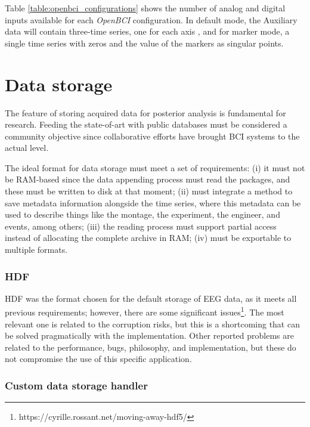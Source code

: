 

Table \ref{table:openbci_configurations} shows the number of analog and digital inputs available for each \textit{OpenBCI} configuration. In default mode, the Auxiliary data will contain three-time series, one for each axis , and for marker mode, a single time series with zeros and the value of the markers as singular points. 

\section{Data storage}

The feature of storing acquired data for posterior analysis is fundamental for research. Feeding the state-of-art with public databases must be considered a community objective since collaborative efforts have brought \gls*{BCI} systems to the actual level.

The ideal format for data storage must meet a set of requirements: 
(i) it must not be RAM-based since the data appending process must read the packages, and these must be written to disk at that moment;
(ii) must integrate a method to save metadata information alongside the time series, where this metadata can be used to describe things like the montage, the experiment, the engineer, and events, among others;
(iii) the reading process must support partial access instead of allocating the complete archive in RAM;
(iv) must be exportable to multiple formats.

\subsubsection{\gls*{HDF}}

\gls*{HDF} was the format chosen for the default storage of EEG data, as it meets all previous requirements; however, there are some significant issues\footnote{https://cyrille.rossant.net/moving-away-hdf5/}. The most relevant one is related to the corruption risks, but this is a shortcoming that can be solved pragmatically with the implementation. Other reported problems are related to the performance, bugs, philosophy, and implementation, but these do not compromise the use of this specific application.

\subsubsection{Custom data storage handler}

